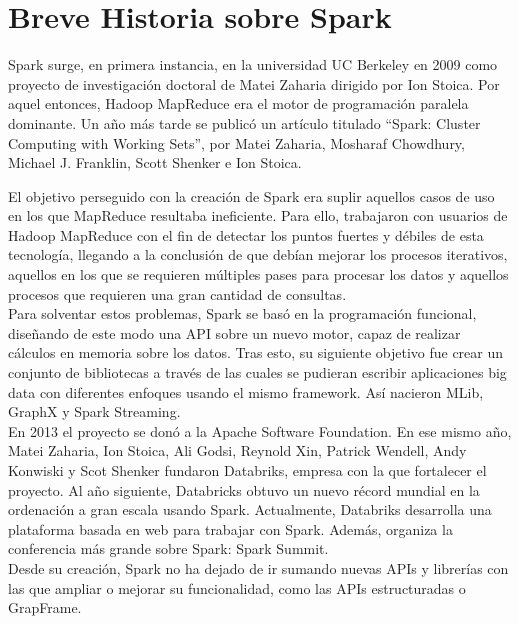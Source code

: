 \chapter{Breve Historia sobre Spark}

Spark surge, en primera instancia,  en la universidad UC Berkeley en 2009 como proyecto de investigación doctoral de Matei Zaharia dirigido por Ion Stoica. Por aquel entonces, Hadoop MapReduce era el motor de programación paralela dominante. Un año más tarde se publicó un artículo titulado “Spark: Cluster Computing with Working Sets”, por Matei Zaharia, Mosharaf Chowdhury, Michael J. Franklin, Scott Shenker e Ion Stoica. 

El objetivo perseguido con la creación de Spark era suplir aquellos casos de uso en los que MapReduce resultaba ineficiente. Para ello, trabajaron con usuarios de Hadoop MapReduce con el fin de detectar los puntos fuertes y débiles de esta tecnología, llegando a la conclusión de que debían mejorar los procesos iterativos, aquellos en los que se requieren múltiples pases para procesar los datos y aquellos procesos que requieren una gran cantidad de consultas.\\

Para solventar estos problemas, Spark se basó en la programación funcional, diseñando de este modo una API sobre un nuevo motor, capaz de realizar cálculos en memoria sobre los datos.
Tras esto, su siguiente objetivo fue crear un conjunto de bibliotecas a través de las cuales se pudieran escribir aplicaciones big data con diferentes enfoques usando el mismo framework. Así nacieron MLib, GraphX y Spark Streaming.\\

En 2013 el proyecto se donó a la Apache Software Foundation. En ese mismo año, Matei Zaharia, Ion Stoica, Ali Godsi, Reynold Xin, Patrick Wendell, Andy Konwiski y Scot Shenker fundaron Databriks, empresa con la que fortalecer el proyecto. Al año siguiente, Databricks obtuvo un nuevo récord mundial \cite{recordSorting} en la ordenación a gran escala usando Spark. Actualmente, Databriks desarrolla una plataforma basada en web para trabajar con Spark. Además, organiza la conferencia más grande sobre Spark: Spark Summit.\\

Desde su creación, Spark no ha dejado de ir sumando nuevas APIs y librerías con las que ampliar o mejorar su funcionalidad, como las APIs estructuradas o GrapFrame.
